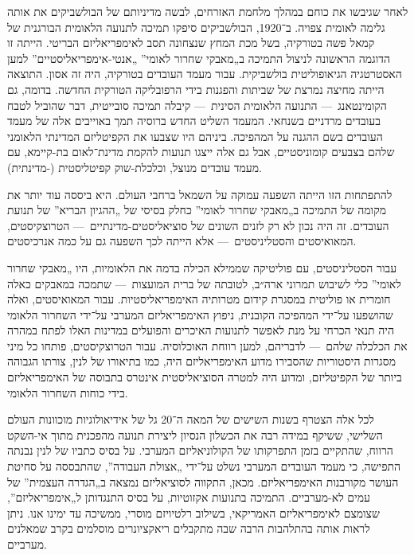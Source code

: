 לאחר שגיבשו את כוחם במהלך מלחמת האזרחים, לבשה מדיניותם של הבולשביקים את אותה גלימה לאומית צפויה. ב־1920, הבולשביקים סיפקו תמיכה לתנועה הלאומית הבורגנית של קמאל פשה בטורקיה, בשל מכת המחץ שנצחונה תסב לאימפריאליזם הבריטי. הייתה זו הדוגמה הראשונה לניצול התמיכה ב„מאבקי שחרור לאומי” „אנטי-אימפריאליסטיים” למען האסטרטגיה הגיאופוליטית בולשביקית. עבור מעמד העובדים בטורקיה, היה זה אסון. התוצאה הייתה מחיצה נמרצת של שביתות והפגנות בידי הרפובליקה הטורקית החדשה. בדומה, גם הקומינטאנג~— התנועה הלאומית הסינית~— קיבלה תמיכה סובייטית, דבר שהוביל לטבח בעובדים מרדניים בשנחאי. המעמד השליט החדש ברוסיה תמך באוייבים אלה של מעמד העובדים בשם ההגנה על המהפיכה. ביניהם היו שצבעו את הקפיטליזם המדינתי הלאומני שלהם בצבעים קומוניסטיים, אבל גם אלה ייצגו תנועות להקמת מדינת־לאום בת-קיימא, עם מעמד עובדים מנוצל, וכלכלת-שוק קפיטליסטית (-מדינתית).

להתפתחות הזו הייתה השפעה עמוקה על השמאל ברחבי העולם. היא ביססה עוד יותר את מקומה של התמיכה ב„מאבקי שחרור לאומי” כחלק בסיסי של „ההגיון הבריא” של תנועת העובדים. זה היה נכון לא רק לזנים השונים של סוציאליסטים-מדינתיים~— הטרוצקיסטים, המאואיסטים והסטליניסטים~— אלא הייתה לכך השפעה גם על כמה אנרכיסטים.

עבור הסטליניסטים, עם פוליטיקה שממילא הכילה בדמה את הלאומיות, היו „מאבקי שחרור לאומי” כלי לשיבוש תמרוני ארה״ב, לטובתה של ברית המועצות~— שתמכה במאבקים כאלה חומרית או פוליטית במסגרת קידום מטרותיה האימפריאליסטיות. עבור המאואיסטים, ואלה שהושפעו על־ידי המהפיכה הקובנית, ניפוץ האימפריאליזם המערבי על־ידי השחרור הלאומי היה תנאי הכרחי על מנת לאפשר לתנועות האיכרים והפועלים במדינות האלו לפתח במהרה את הכלכלה שלהם~— לדבריהם, למען רווחת האוכלוסיה. עבור הטרוצקיסטים, פותחו כל מיני מסגרות היסטוריות שהסבירו מדוע האימפריאליזם היה, כמו בתיאורו של לנין, צורתו הגבוהה ביותר של הקפיטליזם, ומדוע היה למטרה הסוציאליסטית אינטרס בתבוסה של האימפריאליזם בידי כוחות השחרור הלאומי.

לכל אלה הצטרף בשנות השישים של המאה ה־20 גל של אידיאולוגיות מוכוונות העולם השלישי, ששיקף במידה רבה את הכשלון הנסיון ליצירת תנועה מהפכנית מתוך אי-השקט הרווח, שהתקיים בזמן התפרקותו של הקולוניאליזם המערבי. על בסיס כתביו של לנין נבנתה התפישה, כי מעמד העובדים המערבי נשלט על־ידי „אצולת העבודה”, שהתבססה על סחיטת העושר מקורבנות האימפריאליזם. מכאן, התקווה לסוציאליזם נמצאה ב„הגדרה העצמית” של עמים לא-מערביים. התמיכה בתנועות אקזוטיות, על בסיס התנגדותן ל„אימפריאליזם”, שצומצם לאימפריאליזם האמריקאי, בשילוב רלטיויזם מוסרי, ממשיכה עד ימינו אנו. ניתן לראות אותה בהתלהבות הרבה שבה מתקבלים ריאקציונרים מוסלמים בקרב שמאלנים מערביים.

